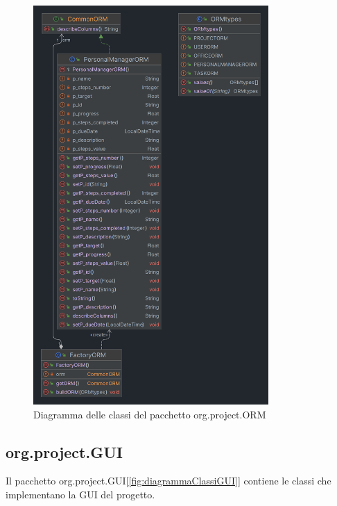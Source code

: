\documentclass[
    10pt, %
    a4paper, %
    oneside, %
    headinclude,footinclude, %
    BCOR5mm, %
]{scrartcl}
\begin{document}
    \begin{figure}[tb]
        \centering
        \includegraphics[width=0.8\textwidth]{Figures/UML/ORM}
        \caption{Diagramma delle classi del pacchetto org.project.ORM}
        \label{fig:diagrammaClassiORM}
    \end{figure}

    \subsection{org.project.GUI}\label{subsec:GUI}

    Il pacchetto org.project.GUI[\ref{fig:diagrammaClassiGUI}] contiene le classi che implementano la GUI del progetto.
\end{document}
